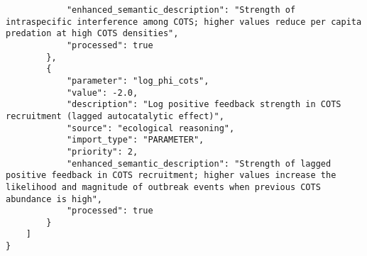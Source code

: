 \begin{lstlisting}
            "enhanced_semantic_description": "Strength of intraspecific interference among COTS; higher values reduce per capita predation at high COTS densities",
            "processed": true
        },
        {
            "parameter": "log_phi_cots",
            "value": -2.0,
            "description": "Log positive feedback strength in COTS recruitment (lagged autocatalytic effect)",
            "source": "ecological reasoning",
            "import_type": "PARAMETER",
            "priority": 2,
            "enhanced_semantic_description": "Strength of lagged positive feedback in COTS recruitment; higher values increase the likelihood and magnitude of outbreak events when previous COTS abundance is high",
            "processed": true
        }
    ]
}
\end{lstlisting}
\clearpage
